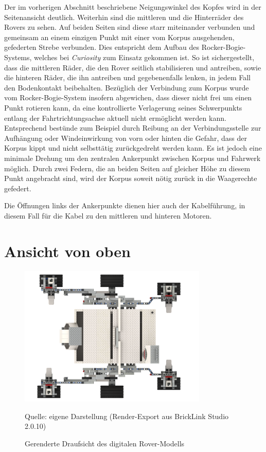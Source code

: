 Der im vorherigen Abschnitt beschriebene Neigungswinkel des Kopfes wird in der Seitenansicht deutlich.
Weiterhin sind die mittleren und die Hinterräder des Rovers zu sehen.
Auf beiden Seiten sind diese starr miteinander verbunden und gemeinsam an einem einzigen Punkt mit einer vom Korpus ausgehenden, gefederten Strebe verbunden.
Dies entspricht dem Aufbau des Rocker-Bogie-Systems, welches bei \textit{Curiosity} zum Einsatz gekommen ist.
So ist sichergestellt, dass die mittleren Räder, die den Rover seitlich stabilisieren und antreiben, sowie die hinteren Räder, die ihn antreiben und gegebenenfalls lenken, in jedem Fall den Bodenkontakt beibehalten.
Bezüglich der Verbindung zum Korpus wurde vom Rocker-Bogie-System insofern abgewichen, dass dieser nicht frei um einen Punkt rotieren kann, da eine kontrollierte Verlagerung seines Schwerpunkts entlang der Fahrtrichtungsachse aktuell nicht ermöglicht werden kann.
Entsprechend bestünde zum Beispiel durch Reibung an der Verbindungsstelle zur Aufhängung oder Windeinwirkung von vorn oder hinten die Gefahr, dass der Korpus kippt und nicht selbsttätig zurückgedreht werden kann.
Es ist jedoch eine minimale Drehung um den zentralen Ankerpunkt zwischen Korpus und Fahrwerk möglich. 
Durch zwei Federn, die an beiden Seiten auf gleicher Höhe zu diesem Punkt angebracht sind, wird der Korpus soweit nötig zurück in die Waagerechte gefedert.

Die Öffnungen links der Ankerpunkte dienen hier auch der Kabelführung, in diesem Fall für die Kabel zu den mittleren und hinteren Motoren.

\section{Ansicht von oben}
\label{sec:draufsicht}

\begin{figure}
	\centering
	\includegraphics[width=0.8\textwidth]{../Images/20200425_Mars_Rover_V5_top.png}
	\vspace{0.5em}
	\parbox[c]{0.8\linewidth}{\footnotesize
		\centering
		\vspace{1em}
		Quelle: eigene Darstellung (Render-Export aus BrickLink Studio 2.0.10)
	}
	\caption{Gerenderte Draufsicht des digitalen Rover-Modells}
	\label{fig:rovertoprender}
\end{figure}

